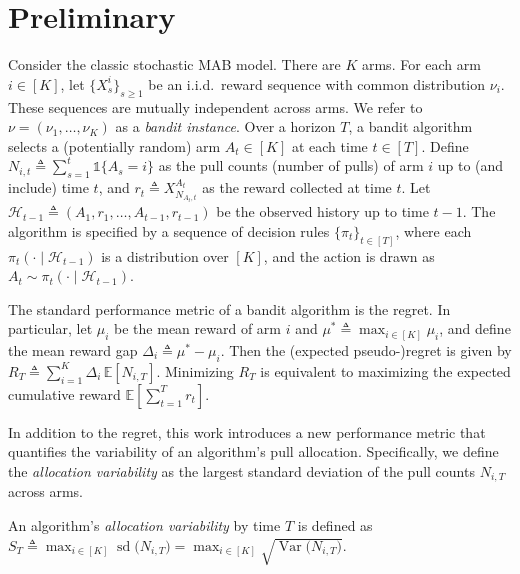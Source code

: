 \documentclass[nonblindrev]{informs3_noinforms}
\newcommand{\var}{\operatorname{Var}}
\newcommand{\E}{{\mathbb{E}}}
\DeclareMathOperator{\sd}{sd}
\begin{document}
\section{Preliminary}\label{sec:preliminary}
Consider the classic stochastic MAB model. There are $K$ arms. For each arm $i\in[K]$, let $\{X^i_s\}_{s\ge 1}$ be an i.i.d.\ reward sequence with common distribution $\nu_i$. These sequences are mutually independent across arms. We refer to $\nu=(\nu_1,\dots,\nu_K)$ as a \textit{bandit instance}. Over a horizon $T$, a bandit algorithm selects a (potentially random) arm $A_t \in [K]$ at each time $t \in [T]$. Define $N_{i,t}\triangleq \sum_{s=1}^t \mathds{1}\{A_s=i\}$ as the pull counts (number of pulls) of arm $i$ up to (and include) time $t$, and $r_t \triangleq X^{A_t}_{N_{A_t,t}}$ as the reward collected at time $t$. Let $\mathcal{H}_{t-1}\triangleq (A_1,r_1,\ldots,A_{t-1},r_{t-1})$ be the observed history up to time $t-1$. The algorithm is specified by a sequence of decision rules $\{\pi_t\}_{t\in[T]}$, where each $\pi_t(\cdot\mid \mathcal{H}_{t-1})$
is a distribution over $[K]$, and the action is drawn as $A_t \sim \pi_t(\cdot\mid \mathcal{H}_{t-1}).$


The standard performance metric of a bandit algorithm is the regret. In particular, let $\mu_i$ be the mean reward of arm $i$ and $\mu^*\triangleq \max_{i\in[K]}\mu_i$, and define the mean reward gap $\Delta_i\triangleq \mu^*-\mu_i$. Then the (expected pseudo-)regret is given by $R_T\triangleq\sum_{i=1}^K \Delta_i\,\E[N_{i,T}]$. Minimizing $R_T$ is equivalent to maximizing the expected cumulative reward $\mathbb{E}\left[\sum_{t= 1}^T r_t \right].$ 

In addition to the regret, this work introduces a new performance metric that quantifies the variability of an algorithm's pull allocation. Specifically, we define the \emph{allocation variability} as the largest standard deviation of the pull counts $N_{i,T}$ across arms.
\begin{definition} 
An algorithm's \emph{allocation variability} by time $T$ is defined as $S_T\triangleq \max_{i\in[K]} \sd\!\big(N_{i,T}\big) = \max_{i\in[K]} \sqrt{\var\big(N_{i,T}\big)}.$
\end{definition}   
\end{document}
